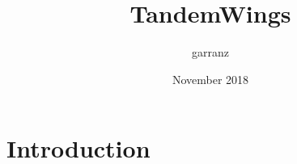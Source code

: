 \documentclass{article}
\title{TandemWings}
\author{garranz }
\date{November 2018}
\begin{document}
\maketitle

\section{Introduction}
\end{document}
